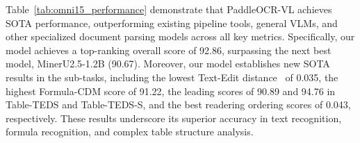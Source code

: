 \documentclass[11pt, a4paper,logo,  copyright, nonumbering]{paddleocr}
\begin{document}
Table~\ref{tab:omni15_performance} demonstrate that PaddleOCR-VL achieves SOTA performance, outperforming existing pipeline tools, general VLMs, and other specialized document parsing models across all key metrics. Specifically, our model achieves a top-ranking overall score of 92.86, surpassing the next best model, MinerU2.5-1.2B (90.67). Moreover, our model establishes new SOTA results in the sub-tasks, including the lowest Text-Edit distance~\cite{lcvenshtcin1966binary} of 0.035, the highest Formula-CDM score of 91.22, the leading scores of 90.89 and 94.76 in Table-TEDS and Table-TEDS-S, and the best readering ordering scores of 0.043, respectively. These results underscore its superior accuracy in text recognition, formula recognition, and complex table structure analysis. 
\end{document}
